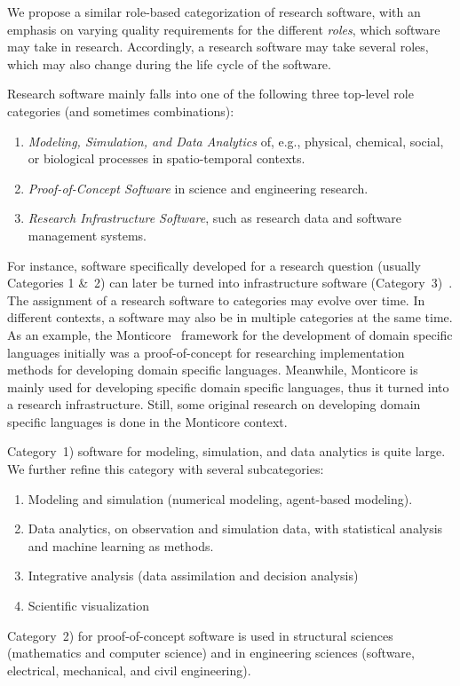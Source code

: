 \documentclass{IEEEcsmag}
\begin{document}
We propose a similar role-based categorization of research software, with an emphasis on varying quality requirements for the different \emph{roles}, which software may take in research.
Accordingly, a research software may take several roles, which may also change during the life cycle of the software.

Research software mainly falls into one of the following three top-level role categories (and sometimes combinations):
\begin{enumerate}
	\item \emph{Modeling, Simulation, and Data Analytics} of, e.g., physical, chemical, social, or biological processes in spatio-temporal contexts.
	\item \emph{Proof-of-Concept Software} in science and engineering research.   
	\item \emph{Research Infrastructure Software}, such as research data and software management systems.
\end{enumerate}
For instance, software specifically developed for a research question (usually Categories 1 \&\ 2) can later be turned into infrastructure software (Category~3)~\cite{Katz2022}.
The assignment of a research software to categories may evolve over time. In different contexts, a software may also be in multiple categories at the same time.
As an example, the Monticore~\cite{Krahn2010} framework for the development of domain specific languages initially was a proof-of-concept for researching implementation methods for developing domain specific languages. Meanwhile, Monticore is mainly used for developing specific domain specific languages, thus it turned into a research infrastructure. Still, some original research on developing domain specific languages is done in the Monticore context.

Category~1) software for modeling, simulation, and data analytics is quite large. We further refine this category with several subcategories:

\begin{enumerate}[label=1.\arabic*)]
\itemindent=1em
	\item Modeling and simulation (numerical modeling, agent-based modeling).
	\item Data analytics, on observation and simulation data, with statistical analysis and machine learning as methods.
	\item Integrative analysis (data assimilation and decision analysis)
	\item Scientific visualization
\end{enumerate}
Category~2) for proof-of-concept software is used in structural sciences (mathematics and computer science) and in engineering sciences (software, electrical, mechanical, and civil engineering).
\end{document}
